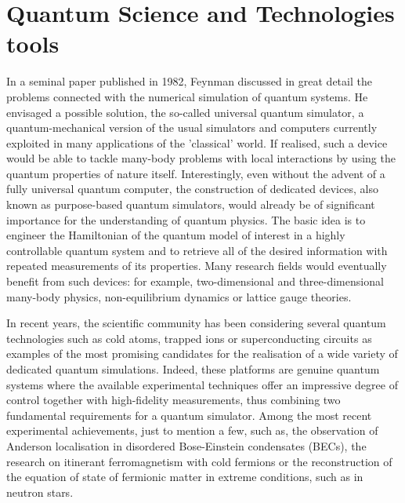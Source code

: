 \documentclass[epj,final]{svjour}
\begin{document}
\section{Quantum Science and Technologies tools}
\label{QSTtools}

In a seminal paper published in 1982, Feynman discussed in great detail the problems connected with the numerical simulation of quantum systems. He envisaged a possible solution, the so-called universal quantum simulator, a quantum-mechanical version of the usual simulators and computers currently exploited in many applications of the 'classical' world. If realised, such a device would be able to tackle many-body problems with local interactions by using the quantum properties of nature itself. Interestingly, even without the advent of a fully universal quantum computer, the construction of dedicated devices, also known as purpose-based quantum simulators, would already be of significant importance for the understanding of quantum physics. The basic idea is to engineer the Hamiltonian of the quantum model of interest in a highly controllable quantum system and to retrieve all of the desired information with repeated measurements of its properties. Many research fields would eventually benefit from such devices: for example, two-dimensional and three-dimensional many-body physics, non-equilibrium dynamics or lattice gauge theories.

In recent years, the scientific community has been considering several quantum technologies such as cold atoms, trapped ions or superconducting circuits as examples of the most promising candidates for the realisation of a wide variety of dedicated quantum simulations. Indeed, these platforms are genuine quantum systems where the available experimental techniques offer an impressive degree of control together with high-fidelity measurements, thus combining two fundamental requirements for a quantum simulator. Among the most recent experimental achievements, just to mention a few, such as, the observation of Anderson localisation in disordered Bose-Einstein condensates (BECs), the research on itinerant ferromagnetism with cold fermions or the reconstruction of the equation of state of fermionic matter in extreme conditions, such as in neutron stars.
\end{document}
